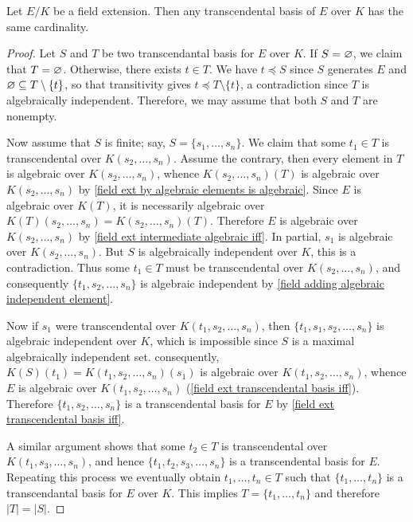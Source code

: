 \begin{theorem}\label{field ext transcendental invariance degree}
Let $E/K$ be a field extension. Then any transcendental basis of $E$ over $K$ has the same cardinality.
\end{theorem}
\begin{proof}
Let $S$ and $T$ be two transcendantal basis for $E$ over $K$. If $S=\varnothing$, we claim that $T=\varnothing$. Otherwise, there exists $t\in T$. We have $t\preceq S$ since $S$ generates $E$ and $\varnothing\subseteq T\setminus\{t\}$, so that transitivity gives $t\preceq T\setminus\{t\}$, a contradiction since $T$ is algebraically independent. Therefore, we may assume that both $S$ and $T$ are nonempty.\par
Now assume that $S$ is finite; say, $S=\{s_1,\dots,s_n\}$. We claim that some $t_1\in T$ is transcendental over $K(s_2,\dots,s_n)$. Assume the contrary, then every element in $T$ is algebraic over $K(s_2,\dots,s_n)$, whence $K(s_2,\dots,s_n)(T)$ is algebraic over $K(s_2,\dots,s_n)$ by \cref{field ext by algebraic elements is algebraic}. Since $E$ is algebraic over $K(T)$, it is necessarily algebraic over $K(T)(s_2,\dots,s_n)=K(s_2,\dots,s_n)(T)$. Therefore $E$ is algebraic over $K(s_2,\dots,s_n)$ by \cref{field ext intermediate algebraic iff}. In partial, $s_1$ is algebraic over $K(s_2,\dots,s_n)$. But $S$ is algebraically independent over $K$, this is a contradiction. Thus some $t_1\in T$ must be transcendental over $K(s_2,\dots,s_n)$, and consequently $\{t_1,s_2,\dots,s_n\}$ is algebraic independent by \cref{field adding algebraic independent element}.\par
Now if $s_1$ were transcendental over $K(t_1,s_2,\dots,s_n)$, then $\{t_1,s_1,s_2,\dots,s_n\}$ is algebraic independent over $K$, which is impossible since $S$ is a maximal algebraically independent set. consequently, $K(S)(t_1)=K(t_1,s_2,\dots,s_n)(s_1)$ is algebraic over $K(t_1,s_2,\dots,s_n)$, whence $E$ is algebraic over $K(t_1,s_2,\dots,s_n)$ (\cref{field ext transcendental basis iff}). Therefore $\{t_1,s_2,\dots,s_n\}$ is a transcendental basis for $E$ by \cref{field ext transcendental basis iff}.\par
A similar argument shows that some $t_2\in T$ is transcendental over $K(t_1,s_3,\dots,s_n)$, and hence $\{t_1,t_2,s_3,\dots,s_n\}$ is a transcendental basis for $E$. Repeating this process we eventually obtain $t_1,\dots,t_n\in T$ such that $\{t_1,\dots,t_n\}$ is a transcendantal basis for $E$ over $K$. This implies $T=\{t_1,\dots,t_n\}$ and therefore $|T|=|S|$.\par

\end{proof}

